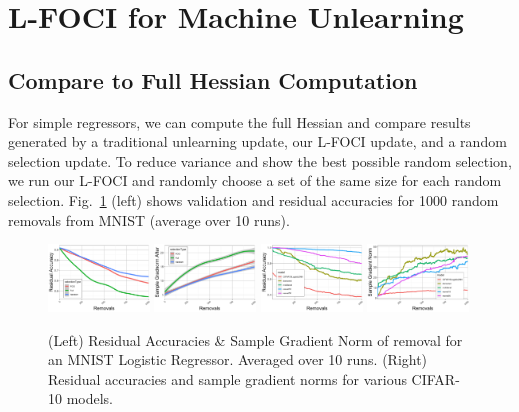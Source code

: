 \section{L-FOCI for Machine Unlearning}

\subsection{Compare to Full Hessian Computation}
For simple regressors, we can compute the full Hessian and compare results generated by a traditional unlearning update, our L-FOCI update, and a random selection update. To reduce variance and show the best possible random selection, we run our L-FOCI and randomly choose a set of the same size for each random selection. Fig.~\ref{fig:mnistcifar} (left) shows validation and residual accuracies for 1000 random removals from MNIST (average over 10 runs). 

\begin{figure}[h!]
    \centering
    \includegraphics[width=0.24\textwidth]{5_unlearn/figs/scrub/MNIST_Resid_Acc.png}
     \includegraphics[width=0.24\textwidth]{5_unlearn/figs/scrub/MNIST_GradNorm_Logistic.png}
     \vspace{-8pt}
    \includegraphics[width=0.24\textwidth]{5_unlearn/figs/scrub/cifar_resid.png}
    \includegraphics[width=0.24\textwidth]{5_unlearn/figs/scrub/CIFAR_gradnom.png}
    \caption{(Left) Residual Accuracies \& Sample Gradient Norm of removal for an MNIST Logistic Regressor. Averaged over 10 runs. (Right) Residual accuracies and sample gradient norms for various CIFAR-10 models.}
    \label{fig:mnistcifar}
\end{figure}


